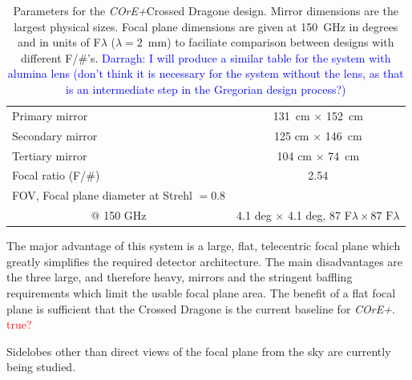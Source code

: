 \documentclass[11pt,a4paper]{article}
\newcommand{\comred}[1]{\textcolor{red}{#1}}
\newcommand{\comblue}[1]{\textcolor{blue}{#1}}
\newcommand{\coreplus}{\textit{\negthinspace COrE+\/}}
\begin{document}
\begin{table}[h!]
	\centering
	\begin{tabular}{|l|c|}
		\hline
		Primary mirror   & 131~cm $\times$ 152~cm   \\
		Secondary mirror   & 125 cm $\times$ 146~cm  \\
		Tertiary mirror  & 104 cm $\times$ 74~cm    \\
		Focal ratio (F/\#)               & 2.54   \\
		\multicolumn{1}{|l|}{FOV, Focal plane diameter at Strehl $= 0.8$} & \\
		\multicolumn{1}{|c|}{@ 150 GHz}    & 4.1 deg $\times$ 4.1 deg, 87 F$\lambda \times 87 \text{~F}\lambda$ \\
		\hline
		
	\end{tabular}
	\caption{Parameters for the \coreplus Crossed Dragone design.  Mirror dimensions are the largest physical sizes.  Focal 
		plane dimensions are given at 150~GHz in degrees and in units of F$\lambda$ ($\lambda=2$~mm) to faciliate comparison between 
		designs with different F/\#'s.
		\comblue{Darragh: I will produce a similar table for the system with alumina lens (don't think it is necessary for the system without the lens, as that is an intermediate step in the Gregorian design process?)} }
	\label{tab:mirrors}
	
\end{table}

The major advantage of this system is a large, flat, telecentric focal plane which greatly simplifies 
the required detector architecture.  The main disadvantages are the three large, and therefore heavy, 
mirrors and the stringent baffling requirements which limit the usable focal plane area.  The benefit of 
a flat focal plane is sufficient that the Crossed Dragone is the current baseline for \coreplus. \comred{true?}

Sidelobes 
other than direct views of the focal plane from 
the sky are currently being studied.



\end{document}
